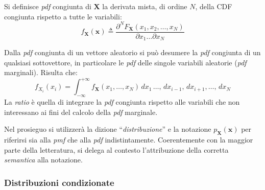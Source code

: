 \begin{Mybox}
    \begin{definizione}
    Si definisce \emph{pdf} congiunta di $\mathbf{X}$ la derivata mista, di ordine $N$, della
    CDF congiunta rispetto a tutte le variabili:
    \begin{equation}
         f_{\mathbf{X}}(\mathbf{x})\triangleq \frac{\partial^N F_{\mathbf{X}}(x_1,x_2,\dots,x_N)}{\partial x_1 \dots\partial x_N}
    \end{equation}
    \end{definizione}  
\end{Mybox}
\medskip
\begin{oss}[Marginalizzazione]
Dalla \emph{pdf} congiunta di un vettore aleatorio si può desumere la \emph{pdf} congiunta di un qualsiasi sottovettore, in particolare le \emph{pdf} 
delle singole variabili aleatorie (\emph{pdf} marginali). Risulta che:
\begin{equation}
    f_{X_i}(x_i)= \int_{-\infty}^{+\infty}  f_{\mathbf{X}}(x_1,\dots,x_N) \,dx_1\,\dots,\,dx_{i-1},\,dx_{i+1},\dots,\,dx_N \label{eq:marginalizzazione}
\end{equation}
La \emph{ratio} è quella di integrare la \emph{pdf} congiunta rispetto alle variabili che non interessano ai fini del 
calcolo della \emph{pdf} marginale.
\end{oss}
\medskip
\begin{Mybox2}
    \begin{oss}[Notazione]
    Nel prosieguo si utilizzerà la dizione “\emph{distribuzione}” e la notazione $p_{\mathbf{X}}(\mathbf{x})$ 
    per riferirsi sia alla \emph{pmf} che alla \emph{pdf} indistintamente.
    Coerentemente con la maggior parte della letteratura, si delega al contesto 
    l'attribuzione della corretta \emph{semantica} alla notazione.
    \end{oss}
\end{Mybox2}

\subsubsection{Distribuzioni condizionate}

